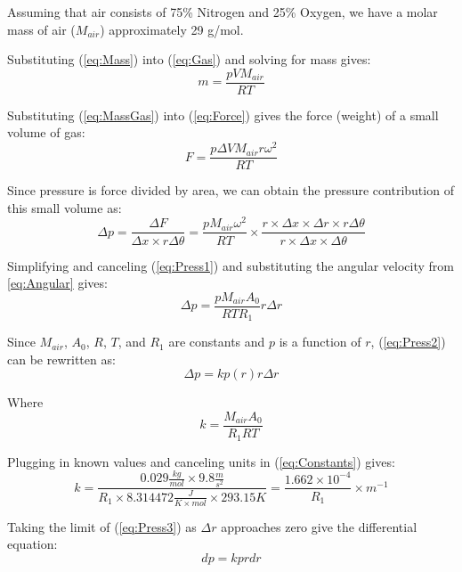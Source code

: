 \documentclass[10pt, openany]{article}
\begin{document}
Assuming that air consists of 75\% Nitrogen and 25\% Oxygen, we have a molar mass of air ($M_{air}$) approximately 29 g/mol.

Substituting (\ref{eq:Mass}) into (\ref{eq:Gas}) and solving for mass gives:
\begin{equation}\label{eq:MassGas}
m=\frac{pVM_{air}}{RT}
\end{equation}

Substituting (\ref{eq:MassGas}) into (\ref{eq:Force}) gives the force (weight) of a small volume of gas:
\begin{equation}\label{eq:ForceGas}
F = \frac{p\Delta VM_{air}r\omega^2}{RT}
\end{equation}

Since pressure is force divided by area, we can obtain the pressure contribution of this small volume as:
\begin{equation}\label{eq:Press1}
\Delta p = \frac{\Delta F}{\Delta x \times r\Delta\theta} = \frac{pM_{air}\omega^{2}}{RT} \times \frac{r \times \Delta x \times \Delta r \times r\Delta\theta}{r \times \Delta x \times \Delta\theta}
\end{equation}

Simplifying and canceling (\ref{eq:Press1}) and substituting the angular velocity from \ref{eq:Angular} gives:
\begin{equation}\label{eq:Press2}
\Delta p =  \frac{pM_{air}A_{0}}{RTR_{1}} r\Delta r
\end{equation}

Since $M_{air}$, $A_{0}$, $R$, $T$, and $R_{1}$ are constants and $p$ is a function of $r$, (\ref{eq:Press2}) can be rewritten as:
\begin{equation}\label{eq:Press3}
\Delta p = k p(r) r\Delta r
\end{equation}

Where
\begin{equation}\label{eq:Constants}
k = \frac{M_{air}A_{0}}{R_{1}RT}
\end{equation}

Plugging in known values and canceling units in (\ref{eq:Constants}) gives:
\begin{equation}\label{eq:ConstNum}
k = \frac{0.029 \frac{kg}{mol} \times 9.8 \frac{m}{s^{2}}}{R_{1} \times 8.314472 \frac{J}{K \times mol} \times 293.15 K} = \frac{1.662 \times 10^{-4}}{R_{1}}\times m^{-1}
\end{equation}

Taking the limit of (\ref{eq:Press3}) as $\Delta r$ approaches zero give the differential equation:
\begin{equation}\label{eq:Press4}
dp = kp rdr
\end{equation}
\end{document}
